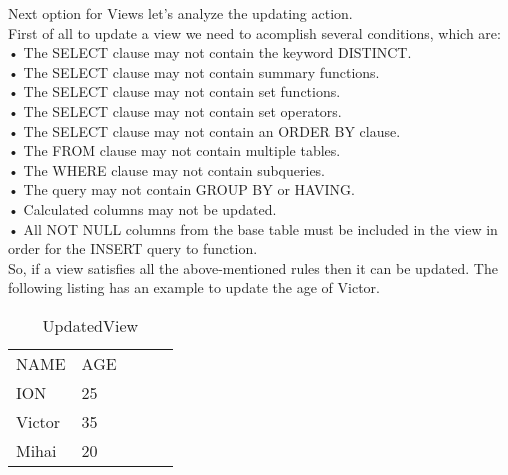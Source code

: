 Next option for Views let's analyze the updating action.\\
First of all to update a view we need to acomplish several conditions, which are:\\
• The SELECT clause may not contain the keyword DISTINCT.\\
• The SELECT clause may not contain summary functions.\\
• The SELECT clause may not contain set functions.\\
• The SELECT clause may not contain set operators.\\
• The SELECT clause may not contain an ORDER BY clause.\\
• The FROM clause may not contain multiple tables.\\
• The WHERE clause may not contain subqueries.\\
• The query may not contain GROUP BY or HAVING.\\
• Calculated columns may not be updated.\\
• All NOT NULL columns from the base table must be included in the view in order for the INSERT query to function.\\

So, if a view satisfies all the above-mentioned rules then it can be updated. The following listing has an example to update the age of Victor.\\

\begin{table}[]
\centering
\caption{UpdatedView}
\begin{tabular}{lllll}
NAME   & AGE &  &  &  \\
ION    & 25  &  &  &  \\
Victor & 35  &  &  &  \\
Mihai  & 20  &  &  & 
\end{tabular}
\end{table}

